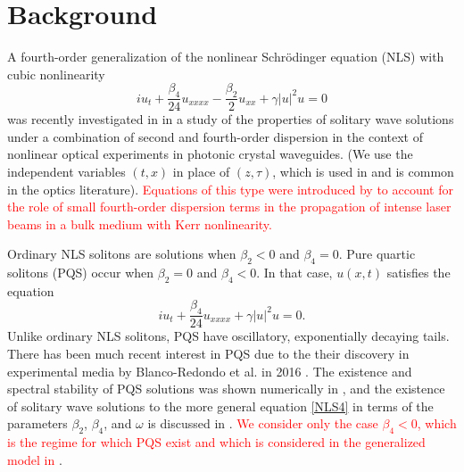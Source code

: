 \documentclass[12pt]{elsarticle}
\newcommand{\revised}[1]{ \textcolor{red}{#1} }
\begin{document}
\section{Background}

A fourth-order generalization of the nonlinear Schr{\"o}dinger equation (NLS) with cubic nonlinearity
\begin{equation}\label{NLS4}
i u_t + \frac{\beta_4}{24}u_{xxxx} - \frac{\beta_2}{2}u_{xx} + \gamma |u|^2 u = 0
\end{equation}
was recently investigated in \cite{Tam2020} in a study of the properties of solitary wave solutions under a combination of second and fourth-order dispersion in the context of nonlinear optical experiments in photonic crystal waveguides. (We use the independent variables $(t, x)$ in place of $(z, \tau)$, which is used in \cite{BlancoPQS,Tam2019,Tam2020} and is common in the optics literature). \revised{Equations of this type were introduced by \cite{Karpman1997,Karpman2000} to account for the role of small fourth-order dispersion terms in the propagation of intense laser beams in a bulk medium with Kerr nonlinearity.}

Ordinary NLS solitons are solutions when $\beta_2 < 0$ and $\beta_4 = 0$. Pure quartic solitons (PQS) occur when $\beta_2 = 0$ and $\beta_4 < 0$. In that case, $u(x,t)$ satisfies the equation
\begin{equation}\label{PQSeq}
i u_t + \frac{\beta_4}{24}u_{xxxx} + \gamma |u|^2 u = 0.
\end{equation}
Unlike ordinary NLS solitons, PQS have oscillatory, exponentially decaying tails. There has been much recent interest in PQS due to the their discovery in experimental media by Blanco-Redondo et al. in 2016 \cite{BlancoPQS}. The existence and spectral stability of PQS solutions was shown numerically in \cite{Tam2019}, and the existence of solitary wave solutions to the more general equation \cref{NLS4} in terms of the parameters $\beta_2$, $\beta_4$, and $\omega$ is discussed in \cite{Tam2020}. \revised{We consider only the case $\beta_4 < 0$, which is the regime for which PQS exist \cite{Tam2019} and which is considered in the generalized model in \cite{Tam2020}}.
\end{document}
